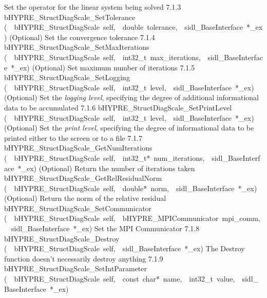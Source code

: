 \documentclass{article}
\begin{document}
\begin{cxxentry}
\begin{cxxentry}
\begin{cxxnames}
        {
Set the operator for the linear system being solved}
        {7.1.3}
        {bHYPRE\_StructDiagScale\_SetTolerance}
        {(\ \ bHYPRE\_StructDiagScale\ self,\ \ double\ tolerance,\ \ sidl\_BaseInterface\ *\_ex)}
        {
(Optional) Set the convergence tolerance}
        {7.1.4}
        {bHYPRE\_StructDiagScale\_SetMaxIterations}
        {(\ \ bHYPRE\_StructDiagScale\ self,\ \ int32\_t\ max\_iterations,\ \ sidl\_BaseInterface\ *\_ex)}
        {
(Optional) Set maximum number of iterations}
        {7.1.5}
        {bHYPRE\_StructDiagScale\_SetLogging}
        {(\ \ bHYPRE\_StructDiagScale\ self,\ \ int32\_t\ level,\ \ sidl\_BaseInterface\ *\_ex)}
        {
(Optional) Set the {\it logging level}, specifying the degree
of additional informational data to be accumulated}
        {7.1.6}
        {bHYPRE\_StructDiagScale\_SetPrintLevel}
        {(\ \ bHYPRE\_StructDiagScale\ self,\ \ int32\_t\ level,\ \ sidl\_BaseInterface\ *\_ex)}
        {
(Optional) Set the {\it print level}, specifying the degree
of informational data to be printed either to the screen or
to a file}
        {7.1.7}
        {bHYPRE\_StructDiagScale\_GetNumIterations}
        {(\ \ bHYPRE\_StructDiagScale\ self,\ \ int32\_t*\ num\_iterations,\ \ sidl\_BaseInterface\ *\_ex)}
        {
(Optional) Return the number of iterations taken}
        {}
\label{cxx.7.1.15}
        {bHYPRE\_StructDiagScale\_GetRelResidualNorm}
        {(\ \ bHYPRE\_StructDiagScale\ self,\ \ double*\ norm,\ \ sidl\_BaseInterface\ *\_ex)}
        {
(Optional) Return the norm of the relative residual}
        {}
\label{cxx.7.1.16}
        {bHYPRE\_StructDiagScale\_SetCommunicator}
        {(\ \ bHYPRE\_StructDiagScale\ self,\ \ bHYPRE\_MPICommunicator\ mpi\_comm,\ \ sidl\_BaseInterface\ *\_ex)}
        {
Set the MPI Communicator}
        {7.1.8}
        {bHYPRE\_StructDiagScale\_Destroy}
        {(\ \ bHYPRE\_StructDiagScale\ self,\ \ sidl\_BaseInterface\ *\_ex)}
        {
The Destroy function doesn't necessarily destroy anything}
        {7.1.9}
        {bHYPRE\_StructDiagScale\_SetIntParameter}
        {(\ \ bHYPRE\_StructDiagScale\ self,\ \ const\ char*\ name,\ \ int32\_t\ value,\ \ sidl\_BaseInterface\ *\_ex)}

\end{cxxnames}
\end{cxxentry}
\end{cxxentry}
\end{document}
